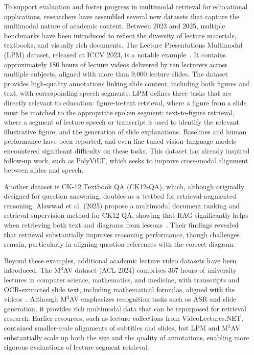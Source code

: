 To support evaluation and foster progress in multimodal retrieval for educational applications, researchers have assembled several new datasets that capture the multimodal nature of academic content. Between 2023 and 2025, multiple benchmarks have been introduced to reflect the diversity of lecture materials, textbooks, and visually rich documents.  
The Lecture Presentations Multimodal (LPM) dataset, released at ICCV 2023, is a notable example~\cite{lee2023lpm}. It contains approximately 180 hours of lecture videos delivered by ten lecturers across multiple subjects, aligned with more than 9,000 lecture slides. The dataset provides high-quality annotations linking slide content, including both figures and text, with corresponding speech segments. LPM defines three tasks that are directly relevant to education: figure-to-text retrieval, where a figure from a slide must be matched to the appropriate spoken segment; text-to-figure retrieval, where a segment of lecture speech or transcript is used to identify the relevant illustrative figure; and the generation of slide explanations. Baselines and human performance have been reported, and even fine-tuned vision–language models encountered significant difficulty on these tasks. This dataset has already inspired follow-up work, such as PolyViLT, which seeks to improve cross-modal alignment between slides and speech.

Another dataset is CK-12 Textbook QA (CK12-QA), which, although originally designed for question answering, doubles as a testbed for retrieval-augmented reasoning. Alawwad et al. (2025) propose a multimodal document ranking and retrieval supervision method for CK12-QA, showing that RAG significantly helps when retrieving both text and diagrams from lessons~\cite{alawwad2025jetrtqa}. Their findings revealed that retrieval substantially improves reasoning performance, though challenges remain, particularly in aligning question references with the correct diagram.

Beyond these examples, additional academic lecture video datasets have been introduced. The M\(^3\)AV dataset (ACL 2024) comprises 367 hours of university lectures in computer science, mathematics, and medicine, with transcripts and OCR-extracted slide text, including mathematical formulas, aligned with the videos~\cite{chen2024m3av}. Although M\(^3\)AV emphasizes recognition tasks such as ASR and slide generation, it provides rich multimodal data that can be repurposed for retrieval research. Earlier resources, such as lecture collections from VideoLectures.NET, contained smaller-scale alignments of subtitles and slides, but LPM and M\(^3\)AV substantially scale up both the size and the quality of annotations, enabling more rigorous evaluations of lecture segment retrieval.

